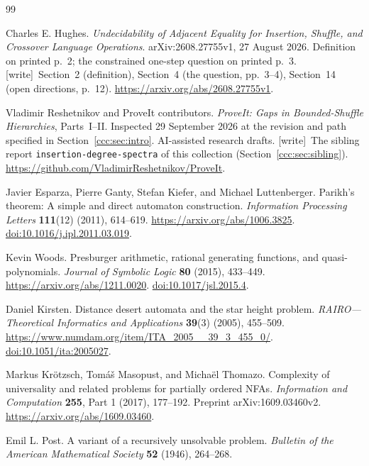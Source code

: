 \documentclass[11pt,letterpaper]{article}
\theoremstyle{definition}
\theoremstyle{remark}
\newcommand{\wtag}{\textup{[write]}}
\begin{document}
\begin{thebibliography}{99}
\small\raggedright\setlength{\itemsep}{1pt}\setlength{\parsep}{0pt}\setlength{\parskip}{0pt}
Charles E. Hughes.
\emph{Undecidability of Adjacent Equality for Insertion, Shuffle, and Crossover
Language Operations}.
arXiv:2608.27755v1, 27 August 2026.
Definition on printed p.~2; the constrained one-step question on printed p.~3.
\wtag\ Section~2 (definition), Section~4 (the question, pp.~3--4),
Section~14 (open directions, p.~12).
\url{https://arxiv.org/abs/2608.27755v1}.

Vladimir Reshetnikov and ProveIt contributors.
\emph{ProveIt: Gaps in Bounded-Shuffle Hierarchies}, Parts~I--II.
Inspected 29 September 2026 at the revision and path specified in
Section~\ref{ccc:sec:intro}. AI-assisted research drafts.
\wtag\ The sibling report \texttt{insertion-degree-spectra} of this
collection (Section~\ref{ccc:sec:sibling}).
\url{https://github.com/VladimirReshetnikov/ProveIt}.

Javier Esparza, Pierre Ganty, Stefan Kiefer, and Michael Luttenberger.
Parikh's theorem: A simple and direct automaton construction.
\emph{Information Processing Letters} \textbf{111}(12) (2011), 614--619.
\url{https://arxiv.org/abs/1006.3825}.
\href{https://doi.org/10.1016/j.ipl.2011.03.019}{doi:10.1016/j.ipl.2011.03.019}.

Kevin Woods.
Presburger arithmetic, rational generating functions, and quasi-polynomials.
\emph{Journal of Symbolic Logic} \textbf{80} (2015), 433--449.
\url{https://arxiv.org/abs/1211.0020}.
\href{https://doi.org/10.1017/jsl.2015.4}{doi:10.1017/jsl.2015.4}.

Daniel Kirsten.
Distance desert automata and the star height problem.
\emph{RAIRO---Theoretical Informatics and Applications}
\textbf{39}(3) (2005), 455--509.
\url{https://www.numdam.org/item/ITA_2005__39_3_455_0/}.
\href{https://doi.org/10.1051/ita:2005027}{doi:10.1051/ita:2005027}.

Markus Kr\"otzsch, Tom\'a\v{s} Masopust, and Micha\"el Thomazo.
Complexity of universality and related problems for partially ordered
NFAs. \emph{Information and Computation} \textbf{255}, Part 1 (2017), 177--192.
Preprint arXiv:1609.03460v2.
\url{https://arxiv.org/abs/1609.03460}.

Emil L. Post.
A variant of a recursively unsolvable problem.
\emph{Bulletin of the American Mathematical Society}
\textbf{52} (1946), 264--268.


\end{thebibliography}
\end{document}
